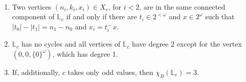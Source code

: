 \begin{lemma}\label{lemma:L0_basics}~ 
    \begin{enumerate}[label=(\alph*)]
        \item Two vertices $(n_i,k_i,x_i)\in X_c$, for $i<2$, are in the same connected component of $\mathbb L_c$ if and only if there are $t_i\in2^{<\omega}$ and $x\in2^\omega$ such that $|t_0|-|t_1|=n_1-n_0$ and $x_i=t_i^\smallfrown x$.
        
        \item $\mathbb L_c$ has no cycles and all vertices of $\mathbb L_c$ have degree 2 except for the vertex $(0,0,\{0\}^\omega)$, which has degree 1.
        
        \item If, additionally, $c$ takes only odd values, then $\chi_B(\mathbb L_c)=3$.
    \end{enumerate}
\end{lemma}


